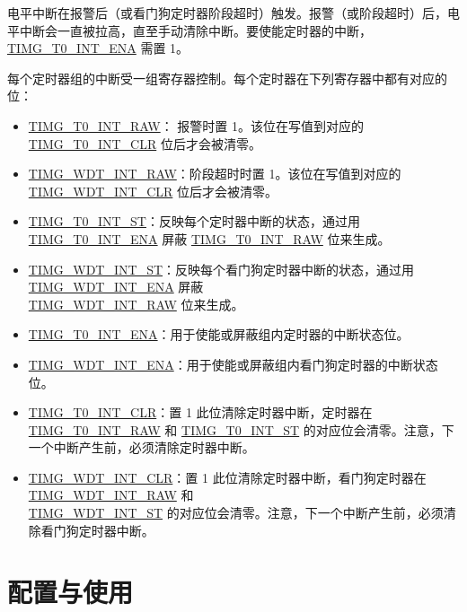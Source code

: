 \documentclass[main\_\_CN.tex]{subfiles}
\begin{document}
电平中断在报警后（或看门狗定时器阶段超时）触发。报警（或阶段超时）后，电平中断会一直被拉高，直至手动清除中断。要使能定时器的中断，\hyperref[fielddesc:TIMGT0INTENA]{TIMG\_T0\_INT\_ENA} 需置 1。

每个定时器组的中断受一组寄存器控制。每个定时器在下列寄存器中都有对应的位：

\begin{itemize}

\item \hyperref[fielddesc:TIMGT0INTRAW]{TIMG\_T0\_INT\_RAW}：
报警时置 1。该位在写值到对应的 \hyperref[fielddesc:TIMGT0INTCLR]{TIMG\_T0\_INT\_CLR} 位后才会被清零。
\item \hyperref[fielddesc:TIMGWDTINTRAW]{TIMG\_WDT\_INT\_RAW}：阶段超时时置 1。该位在写值到对应的 \hyperref[fielddesc:TIMGWDTINTCLR]{TIMG\_WDT\_INT\_CLR} 位后才会被清零。
\item \hyperref[fielddesc:TIMGT0INTST]{TIMG\_T0\_INT\_ST}：反映每个定时器中断的状态，通过用 \hyperref[fielddesc:TIMGT0INTENA]{TIMG\_T0\_INT\_ENA} 屏蔽 \hyperref[fielddesc:TIMGT0INTRAW]{TIMG\_T0\_INT\_RAW} 位来生成。
\item \hyperref[fielddesc:TIMGWDTINTST]{TIMG\_WDT\_INT\_ST}：反映每个看门狗定时器中断的状态，通过用 \hyperref[fielddesc:TIMGWDTINTENA]{TIMG\_WDT\_INT\_ENA} 屏蔽 \\\hyperref[fielddesc:TIMGWDTINTRAW]{TIMG\_WDT\_INT\_RAW} 位来生成。
\item \hyperref[fielddesc:TIMGT0INTENA]{TIMG\_T0\_INT\_ENA}：用于使能或屏蔽组内定时器的中断状态位。
\item \hyperref[fielddesc:TIMGWDTINTENA]{TIMG\_WDT\_INT\_ENA}：用于使能或屏蔽组内看门狗定时器的中断状态位。
\item \hyperref[fielddesc:TIMGT0INTCLR]{TIMG\_T0\_INT\_CLR}：置 1 此位清除定时器中断，定时器在 \hyperref[fielddesc:TIMGT0INTRAW]{TIMG\_T0\_INT\_RAW} 和 \hyperref[fielddesc:TIMGT0INTST]{TIMG\_T0\_INT\_ST} 的对应位会清零。注意，下一个中断产生前，必须清除定时器中断。
\item \hyperref[fielddesc:TIMGWDTINTCLR]{TIMG\_WDT\_INT\_CLR}：置 1 此位清除定时器中断，看门狗定时器在 \hyperref[fielddesc:TIMGWDTINTRAW]{TIMG\_WDT\_INT\_RAW} 和\\\hyperref[fielddesc:TIMGWDTINTST]{TIMG\_WDT\_INT\_ST} 的对应位会清零。注意，下一个中断产生前，必须清除看门狗定时器中断。
\end{itemize}

\section{配置与使用}
\end{document}
